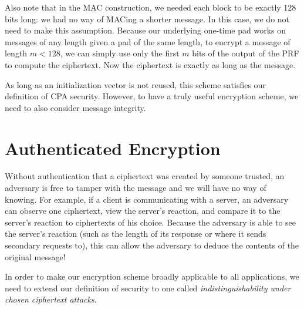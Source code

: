 Also note that in the MAC construction, we needed each block to be exactly 128 bits long: we had no way of MACing a shorter message. In this case, we do not need to make this assumption. Because our underlying one-time pad works on messages of any length given a pad of the same length, to encrypt a message of length $m < 128$, we can simply use only the first $m$ bits of the output of the PRF to compute the ciphertext. Now the ciphertext is exactly as long as the message.

As long as an initialization vector is not reused, this scheme satisfies our definition of CPA security. However, to have a truly useful encryption scheme, we need to also consider message integrity.

\section{Authenticated Encryption}
Without authentication that a ciphertext was created by someone trusted, an adversary is free to tamper with the message and we will have no way of knowing. For example, if a client is communicating with a server, an adversary can observe one ciphertext, view the server's reaction, and compare it to the server's reaction to ciphertexts of his choice. Because the adversary is able to see the server's reaction (such as the length of its response or where it sends secondary requests to), this can allow the adversary to deduce the contents of the original message! 

In order to make our encryption scheme broadly applicable to all applications, we need to extend our definition of security to one called \emph{indistinguishability under chosen ciphertext attacks}.

